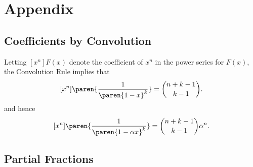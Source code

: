 \documentclass[handout]{mcs}
\begin{document}



\section{Appendix}

\subsection{Coefficients by Convolution}
\iffalse

Let
\begin{align*}
A(x) & = \sum_{n=0}^{\infty} a_n x^n, &
B(x) & = \sum_{n=0}^{\infty} b_n x^n, &
A(x) \cdot B(x) & = \sum_{n=0}^{\infty} c_n x^n.
\end{align*}
Then
\[
c_n = a_0 b_n + a_1 b_{n-1} + a_2 b_{n-2} + \cdots + a_n b_0.
\]

Letting $[x^n]F(x)$ denote the coefficient of $x^n$ in the power series
for $F(x)$, we can restate this as
\[
[x^n]\paren{A(x)\cdot B(x)} \eqdef \sum_{k=0}^n [x^k]A(x)\cdot [x^{n-k}]B(x)
\]

\begin{mathrule*}[Convolution Rule]
Let $A(x)$ be the generating function for selecting items from set
${\cal A}$, and let $B(x)$ be the generating function for selecting
items from set ${\cal B}$.  If ${\cal A}$ and ${\cal B}$ are disjoint,
then the generating function for selecting items from the union ${\cal
A} \cup {\cal B}$ is the product $A(x) \cdot B(x)$.
\end{mathrule*}
\fi

Letting $[x^n]F(x)$ denote the coefficient of $x^n$ in the power series
for $F(x)$, the Convolution Rule implies that
\[
[x^n]\paren{\frac{1}{\paren{1-x}^k}} = \binom{n+k-1}{k-1}.
\]
and hence
\begin{equation}\label{1axk}
[x^n]\paren{\frac{1}{\paren{1-\alpha x}^k}} = \binom{n+k-1}{k-1}\alpha^n.
\end{equation}


\subsection{Partial Fractions}
\end{document}
